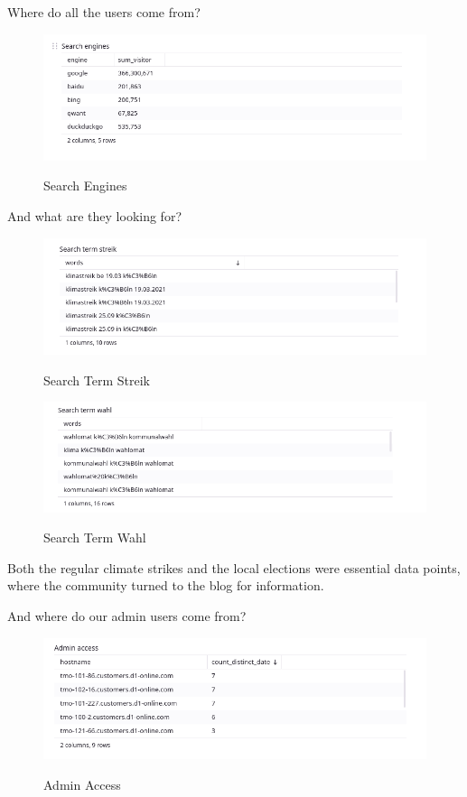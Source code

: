 Where do all the users come from?

\begin{figure}[H]
\centering
\caption {Search Engines}
\includegraphics[width=\linewidth]{images/figure03.png}
\label{fig:searchEngines}
\end{figure}

And what are they looking for?

\begin{figure}[H]
\centering
\caption {Search Term Streik}
\includegraphics[width=\linewidth]{images/figure04.png}
\label{fig:searchStreik}
\end{figure}

\begin{figure}[H]
\centering
\caption {Search Term Wahl}
\includegraphics[width=\linewidth]{images/figure05.png}
\label{fig:searchWahl}
\end{figure}

Both the regular climate strikes and the local elections were essential data points, where the community turned to the blog for information.

And where do our admin users come from?

\begin{figure}[H]
\centering
\caption {Admin Access}
\includegraphics[width=\linewidth]{images/figure06.png}
\label{fig:adminAccess}
\end{figure}

